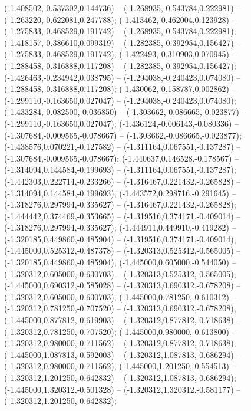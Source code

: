  (-1.408502,-0.537302,0.144736) -- (-1.268935,-0.543784,0.222981) -- (-1.263220,-0.622081,0.247788);
 (-1.413462,-0.462004,0.123928) -- (-1.275833,-0.468529,0.191742) -- (-1.268935,-0.543784,0.222981);
 (-1.418157,-0.386610,0.099319) -- (-1.282385,-0.392954,0.156427) -- (-1.275833,-0.468529,0.191742);
 (-1.422493,-0.310903,0.070945) -- (-1.288458,-0.316888,0.117208) -- (-1.282385,-0.392954,0.156427);
 (-1.426463,-0.234942,0.038795) -- (-1.294038,-0.240423,0.074080) -- (-1.288458,-0.316888,0.117208);
 (-1.430062,-0.158787,0.002862) -- (-1.299110,-0.163650,0.027047) -- (-1.294038,-0.240423,0.074080);
 (-1.433284,-0.082500,-0.036850) -- (-1.303662,-0.086665,-0.023877) -- (-1.299110,-0.163650,0.027047);
 (-1.436124,-0.006143,-0.080336) -- (-1.307684,-0.009565,-0.078667) -- (-1.303662,-0.086665,-0.023877);
 (-1.438576,0.070221,-0.127582) -- (-1.311164,0.067551,-0.137287) -- (-1.307684,-0.009565,-0.078667);
 (-1.440637,0.146528,-0.178567) -- (-1.314094,0.144584,-0.199693) -- (-1.311164,0.067551,-0.137287);
 (-1.442303,0.222714,-0.233266) -- (-1.316467,0.221432,-0.265828) -- (-1.314094,0.144584,-0.199693);
 (-1.443572,0.298716,-0.291645) -- (-1.318276,0.297994,-0.335627) -- (-1.316467,0.221432,-0.265828);
 (-1.444442,0.374469,-0.353665) -- (-1.319516,0.374171,-0.409014) -- (-1.318276,0.297994,-0.335627);
 (-1.444911,0.449910,-0.419282) -- (-1.320185,0.449860,-0.485904) -- (-1.319516,0.374171,-0.409014);
 (-1.445000,0.525312,-0.487378) -- (-1.320313,0.525312,-0.565005) -- (-1.320185,0.449860,-0.485904);
 (-1.445000,0.605000,-0.544050) -- (-1.320312,0.605000,-0.630703) -- (-1.320313,0.525312,-0.565005);
 (-1.445000,0.690312,-0.585028) -- (-1.320313,0.690312,-0.678208) -- (-1.320312,0.605000,-0.630703);
 (-1.445000,0.781250,-0.610312) -- (-1.320312,0.781250,-0.707520) -- (-1.320313,0.690312,-0.678208);
 (-1.445000,0.877812,-0.619903) -- (-1.320312,0.877812,-0.718638) -- (-1.320312,0.781250,-0.707520);
 (-1.445000,0.980000,-0.613800) -- (-1.320312,0.980000,-0.711562) -- (-1.320312,0.877812,-0.718638);
 (-1.445000,1.087813,-0.592003) -- (-1.320312,1.087813,-0.686294) -- (-1.320312,0.980000,-0.711562);
 (-1.445000,1.201250,-0.554513) -- (-1.320312,1.201250,-0.642832) -- (-1.320312,1.087813,-0.686294);
 (-1.445000,1.320312,-0.501328) -- (-1.320312,1.320312,-0.581177) -- (-1.320312,1.201250,-0.642832);
